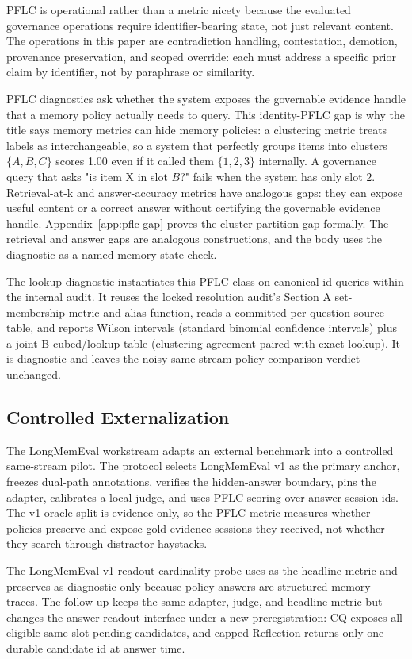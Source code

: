 PFLC is operational rather than a metric nicety because the evaluated
governance operations require identifier-bearing state, not just relevant
content. The operations in this paper are contradiction handling, contestation,
demotion, provenance preservation, and scoped override: each must address a
specific prior claim by identifier, not by paraphrase or similarity.

PFLC diagnostics ask whether the system exposes the governable evidence handle
that a memory policy actually needs to query. This identity-PFLC gap is why the
title says memory metrics can hide memory policies: a clustering metric treats labels
as interchangeable, so a system that perfectly groups items into clusters
$\{A, B, C\}$ scores 1.00 even if it called them $\{1, 2, 3\}$ internally. A
governance query that asks "is item X in slot $B$?" fails when the system has
only slot $2$. Retrieval-at-k and answer-accuracy metrics have analogous gaps:
they can expose useful content or a correct answer without certifying the
governable evidence handle. Appendix~\ref{app:pflc-gap} proves the
cluster-partition gap formally. The retrieval and answer gaps are analogous
constructions, and the body uses the diagnostic as a named memory-state check.

The lookup diagnostic instantiates this PFLC class on canonical-id queries
within the internal audit. It reuses the locked resolution audit's Section A
set-membership metric and alias function, reads a committed per-question
source table, and reports Wilson intervals (standard binomial confidence
intervals) plus a joint B-cubed/lookup table (clustering agreement paired with
exact lookup). It is diagnostic and leaves the noisy same-stream policy
comparison verdict unchanged.

\subsection{Controlled Externalization}

The LongMemEval workstream adapts an external benchmark into a controlled
same-stream pilot. The protocol selects LongMemEval v1 as the primary anchor,
freezes dual-path annotations, verifies the hidden-answer boundary, pins the
adapter, calibrates a local judge, and uses PFLC scoring over answer-session
ids. The v1 oracle split is evidence-only, so the PFLC metric measures whether
policies preserve and expose gold evidence sessions they received, not whether
they search through distractor haystacks.

The LongMemEval v1 readout-cardinality probe uses  as the headline metric and preserves
 as diagnostic-only because policy answers are structured
memory traces. The follow-up keeps the same adapter, judge, and headline metric
but changes the answer readout interface under a new preregistration:
CQ exposes all eligible same-slot pending candidates, and capped Reflection
returns only one durable candidate id at answer time.


